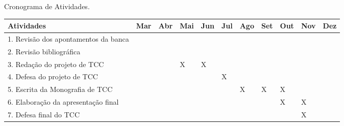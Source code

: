 \begin{quadro}[!htb]
    \caption{Cronograma de Atividades.\label{qua:quadro1}}
    \begin{tabular}{|p{4.5cm}|p{0.7cm}|p{0.7cm}|p{0.7cm}|p{0.7cm}|p{0.7cm}|p{0.7cm}|p{0.7cm}|p{0.7cm}|p{0.7cm}|p{0.7cm}|}
        \hline
        \textbf{Atividades} & \textbf{Mar} & \textbf{Abr} & \textbf{Mai} & \textbf{Jun} & \textbf{Jul} & \textbf{Ago} & \textbf{Set} & \textbf{Out} & \textbf{Nov} & \textbf{Dez} \\
        \hline
        \small{1. Revisão dos apontamentos da banca} &   &   &   &   &   &   &   &   &   &  \\
        \hline
        \small{2. Revisão bibliográfica} &   &   &   &   &   &   &   &   &   &  \\
        \hline
	\small{3. Redação do projeto de TCC} &   &   & X & X &   &   &   &   &   &  \\
        \hline
	\small{4. Defesa do projeto de TCC} &   &   &   &   & X &   &   &   &   &  \\
        \hline
	\small{5. Escrita da Monografia de TCC} &   &   &   &   &   & X & X  & X &   &  \\
        \hline
	\small{6. Elaboração da apresentação final} &   &   &   &   &   &   &   & X & X &  \\
        \hline
	\small{7. Defesa final do TCC} &   &   &   &   &   &   &   &   & X &  \\
        \hline
    \end{tabular}
\end{quadro}
